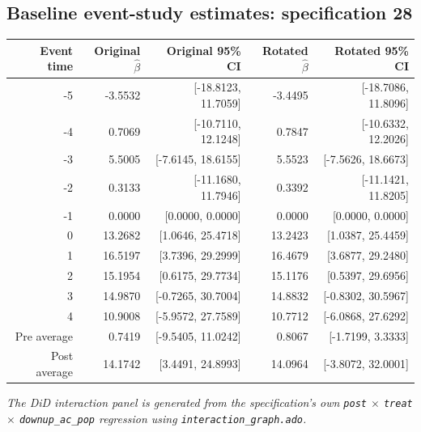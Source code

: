 \documentclass[10pt]{article}
\begin{document}
\subsection*{Baseline event-study estimates: specification 28}
\begin{center}
\scriptsize
\begin{tabular}{r rr rr}
\toprule
Event time & Original $\hat\beta$ & Original 95\% CI & Rotated $\hat\beta$ & Rotated 95\% CI \\
\midrule
-5 & -3.5532 & [-18.8123, 11.7059] & -3.4495 & [-18.7086, 11.8096] \\
-4 & 0.7069 & [-10.7110, 12.1248] & 0.7847 & [-10.6332, 12.2026] \\
-3 & 5.5005 & [-7.6145, 18.6155] & 5.5523 & [-7.5626, 18.6673] \\
-2 & 0.3133 & [-11.1680, 11.7946] & 0.3392 & [-11.1421, 11.8205] \\
-1 & 0.0000 & [0.0000, 0.0000] & 0.0000 & [0.0000, 0.0000] \\
0 & 13.2682 & [1.0646, 25.4718] & 13.2423 & [1.0387, 25.4459] \\
1 & 16.5197 & [3.7396, 29.2999] & 16.4679 & [3.6877, 29.2480] \\
2 & 15.1954 & [0.6175, 29.7734] & 15.1176 & [0.5397, 29.6956] \\
3 & 14.9870 & [-0.7265, 30.7004] & 14.8832 & [-0.8302, 30.5967] \\
4 & 10.9008 & [-5.9572, 27.7589] & 10.7712 & [-6.0868, 27.6292] \\
\midrule
Pre average & 0.7419 & [-9.5405, 11.0242] & 0.8067 & [-1.7199, 3.3333] \\
Post average & 14.1742 & [3.4491, 24.8993] & 14.0964 & [-3.8072, 32.0001] \\
\bottomrule
\end{tabular}
\end{center}
\medskip
\textit{The DiD interaction panel is generated from the specification's own \texttt{post} $\times$ \texttt{treat} $\times$ \texttt{downup\_ac\_pop} regression using \texttt{interaction\_graph.ado}.}
\clearpage
\end{document}
